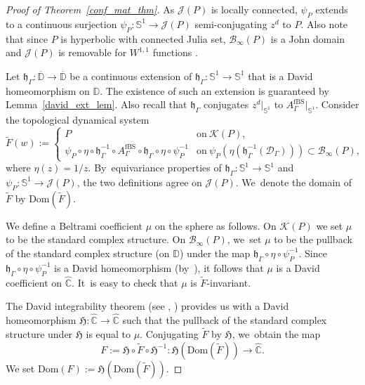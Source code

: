 \documentclass[JEP,XML,SOM,Unicode,NoFloatCountersInSection,published]{cedram}
\theoremstyle{definition}
\theoremstyle{remark}
\newcommand{\C}{\mathbb{C}}
\newcommand{\D}{\mathbb{D}}
\begin{document}
\begin{proof}[Proof of Theorem~\ref{conf_mat_thm}]
As $\mathcal{J}(P)$ is locally connected, $\psi_P$ extends to a continuous surjection $\psi_P:\mathbb{S}^1\to\mathcal{J}(P)$ semi-conjugating $z^d$ to $P$. Also note that since $P$ is hyperbolic with connected Julia set, $\mathcal{B}_\infty(P)$ is a John domain and $\mathcal{J}(P)$ is removable for $W^{1,1}$ functions \cite[Th.\,4]{JS00}.

Let $\mathfrak{h}_\Gamma:\overline{\D}\to\overline{\D}$ be a continuous extension of $\mathfrak{h}_\Gamma:\mathbb{S}^1\to\mathbb{S}^1$ that is a David homeomorphism on $\D$. The existence of such an extension is guaranteed by Lemma~\ref{david_ext_lem}.
Also recall that $\mathfrak{h}_\Gamma$ conjugates $z^d\vert_{\mathbb{S}^1}$ to $A_{\Gamma}^{\mathrm{fBS}}\vert_{\mathbb{S}^1}$.
Consider the topological dynamical system
\begin{equation*}
\widetilde{F}(w):=\begin{cases}
P & \text{on}\ \mathcal{K}(P), \\
\psi_P\circ\eta\circ\mathfrak{h}_\Gamma^{-1}\circ A_{\Gamma}^{\mathrm{fBS}}\circ\mathfrak{h}_\Gamma\circ\eta\circ\psi_P^{-1} & \text{on}\ \psi_P\left(\eta\left(\mathfrak{h}_\Gamma^{-1}\left(\mathcal{D}_{\Gamma}\right)\right)\right)\subset\mathcal{B}_\infty(P),
\end{cases}
\end{equation*}
where $\eta(z)=1/z$. By~equivariance properties of $\mathfrak{h}_\Gamma:\mathbb{S}^1\to\mathbb{S}^1$ and $\psi_P:\mathbb{S}^1\to\mathcal{J}(P)$, the two definitions agree on $\mathcal{J}(P)$. We~denote the domain of $\widetilde{F}$ by $\mathrm{Dom}(\widetilde{F})$.

We define a Beltrami coefficient $\mu$ on the sphere as follows. On $\mathcal{K}(P)$ we set $\mu$ to be
the standard complex structure. On $\mathcal{B}_\infty(P)$, we~set $\mu$ to be the pullback of the standard complex structure (on $\D$) under the map $\mathfrak{h}_\Gamma\circ\eta\circ\psi_P^{-1}$. Since $\mathfrak{h}_\Gamma\circ\eta\circ\psi_P^{-1}$ is a David homeomorphism (by~\cite[Prop.\,2.5(iv)]{LMMN}), it follows that $\mu$ is a David coefficient on $\widehat{\C}$. It~is easy to check that $\mu$ is $\widetilde{F}$-invariant.

The David integrability theorem (see \cite{David}, \cite[Th.\,20.6.2, p.\,578]{AIM09}) provides us with a David homeomorphism $\mathfrak{H}:\widehat{\C}\to\widehat{\C}$ such that the pullback of the standard complex structure under $\mathfrak{H}$ is equal to $\mu$. Conjugating $\widetilde{F}$ by $\mathfrak{H}$, we~obtain the map
\[
F:=\mathfrak{H}\circ\widetilde{F}\circ\mathfrak{H}^{-1}:\mathfrak{H}(\mathrm{Dom}(\widetilde{F}))\to\widehat{\C}.
\]
We set $\mathrm{Dom}(F):= \mathfrak{H}(\mathrm{Dom}(\widetilde{F}))$.


\end{proof}
\end{document}
